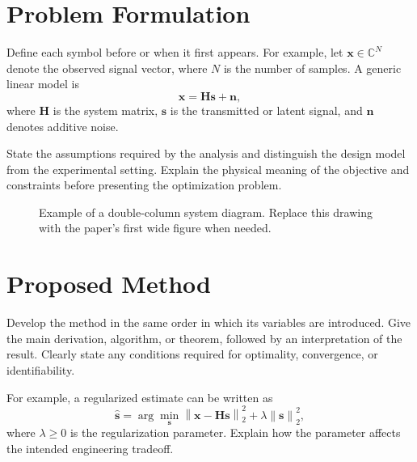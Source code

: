 \documentclass[final,3p,times,twocolumn]{elsarticle}
\begin{document}
\section{Problem Formulation}

Define each symbol before or when it first appears. For example, let $\mathbf{x}\in\mathbb{C}^{N}$ denote the observed signal vector, where $N$ is the number of samples. A generic linear model is
\begin{equation}
  \mathbf{x}=\mathbf{H}\mathbf{s}+\mathbf{n},
  \label{eq:model}
\end{equation}
where $\mathbf{H}$ is the system matrix, $\mathbf{s}$ is the transmitted or latent signal, and $\mathbf{n}$ denotes additive noise.

State the assumptions required by the analysis and distinguish the design model from the experimental setting. Explain the physical meaning of the objective and constraints before presenting the optimization problem.

\begin{figure}[tbp]
  \centering
  \caption{Example of a double-column system diagram. Replace this drawing with the paper's first wide figure when needed.}
  \label{fig:system}
\end{figure}

\section{Proposed Method}

Develop the method in the same order in which its variables are introduced. Give the main derivation, algorithm, or theorem, followed by an interpretation of the result. Clearly state any conditions required for optimality, convergence, or identifiability.

For example, a regularized estimate can be written as
\begin{equation}
  \widehat{\mathbf{s}}
  =\arg\min_{\mathbf{s}}
  \left\|\mathbf{x}-\mathbf{H}\mathbf{s}\right\|_2^2
  +\lambda\left\|\mathbf{s}\right\|_2^2,
  \label{eq:estimate}
\end{equation}
where $\lambda\geq 0$ is the regularization parameter. Explain how the parameter affects the intended engineering tradeoff.
\end{document}

